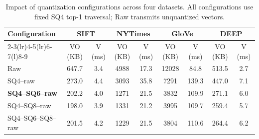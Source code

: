 \begin{table}[t]
\centering
\caption{Impact of quantization configurations across four datasets. All configurations use fixed SQ4 top-1 traversal; Raw transmits unquantized vectors.}
\label{tab:quantization}
\vspace{-0.2cm}
\footnotesize
\setlength{\tabcolsep}{1pt}
\renewcommand{\arraystretch}{1.15}
\begin{tabular}{@{}l*{4}{cc}@{}}
\toprule
\multirow{2}{*}{Configuration}
& \multicolumn{2}{c}{\textsf{SIFT}} & \multicolumn{2}{c}{\textsf{NYTimes}} & \multicolumn{2}{c}{\textsf{GloVe}} & \multicolumn{2}{c}{\textsf{DEEP}} \\
\cmidrule(lr){2-3}\cmidrule(lr){4-5}\cmidrule(lr){6-7}\cmidrule(l){8-9}
& VO (KB) & V (ms) & VO (KB) & V (ms) & VO (KB) & V (ms) & VO (KB) & V (ms) \\
\midrule
Raw & 647.7 & 3.4 & 4988 & 17.3 & 12028 & 84.8 & 513.5 & 2.7 \\
\hline
SQ4--raw & 273.0 & 4.4 & 3093 & 35.8 & 7291 & 139.3 & 447.0 & 7.1 \\
\textbf{SQ4--SQ6--raw} & 202.2 & 4.0 & 1271 & 21.5 & 3832 & 109.9 & 271.1 & 6.0 \\
SQ4--SQ8--raw & 198.0 & 3.9 & 1331 & 21.2 & 3995 & 109.7 & 259.4 & 5.7 \\
SQ4--SQ6--SQ8--raw & 201.5 & 4.2 & 1229 & 21.5 & 3804 & 110.6 & 264.4 & 6.2 \\
\bottomrule
\end{tabular}
\end{table}
